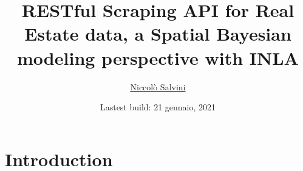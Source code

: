 \documentclass[
  12pt,
  a4paper,
  oneside]{book}
\title{RESTful Scraping API for Real Estate data, a Spatial Bayesian modeling perspective with INLA}
\author{\href{https://niccolosalvini.netlify.app/}{Niccolò Salvini}}
\date{Lastest build: 21 gennaio, 2021}
\let\oldmaketitle\maketitle
\theoremstyle{definition}
\theoremstyle{definition}
\theoremstyle{definition}
\theoremstyle{remark}
\begin{document}
\maketitle


\newpage

\let\maketitle\oldmaketitle
\maketitle

{
\setcounter{tocdepth}{2}
\tableofcontents
}
\listoftables
\listoffigures
{}
\hypertarget{intro}{%
\chapter{Introduction}\label{intro}}
\end{document}
